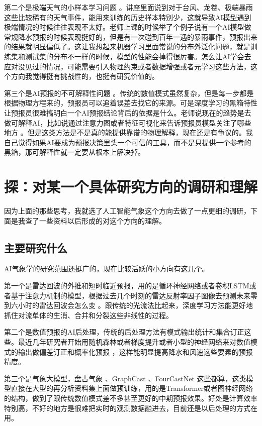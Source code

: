 \documentclass{article}
\begin{document}
第二个是极端天气的小样本学习问题 \cite{Gagne2014Machine}。讲座里面说到对于台风、龙卷、极端暴雨这些比较稀有的天气事件，能用来训练的历史样本特别少，这就导致AI模型遇到极端情况的时候往往表现不太好。老师上课的时候举了个例子说有一个AI模型做常规降水预报的时候表现挺好的，但是有一次碰到百年一遇的暴雨事件，预报出来的结果就明显偏低了。这让我想起来机器学习里面常说的分布外泛化问题，就是训练集和测试集的分布不一样的时候，模型的性能会掉得很厉害。怎么让AI学会去应对没见过的情况，可能需要引入物理约束或者数据增强或者元学习这些方法，这个方向我觉得挺有挑战性的，也挺有研究价值的。

第三个是AI预报的不可解释性问题 \cite{Ham2020Deep}。传统的数值模式虽然复杂，但是每一步都是根据物理方程来的，预报员可以追着误差去找它的来源。可是深度学习的黑箱特性让预报员很难搞明白一个AI预报结论背后的依据是什么。老师说现在的趋势是去做可解释AI，比如说通过注意力图或者特征可视化来告诉预报员模型关注了哪些地方 \cite{Tjoa2020Survey}。但是这类方法是不是真的能提供靠谱的物理解释，现在还是有争议的。我自己觉得如果AI要成为预报决策里头一个可信的工具，而不是只提供一个参考的黑箱，那可解释性就一定要从根本上解决掉。

\section{探：对某一个具体研究方向的调研和理解}

因为上面的那些思考，我就选了人工智能气象这个方向去做了一点更细的调研，下面是我查了一些资料以后形成的对这个方向的理解。

\subsection{主要研究什么}

AI气象学的研究范围还挺广的，现在比较活跃的小方向有这几个。

第一个是雷达回波的外推和短时临近预报，用的是循环神经网络或者卷积LSTM或者基于注意力机制的模型，根据过去几个时刻的雷达反射率因子图像去预测未来零到六小时的雷达回波会怎么变 \cite{Shi2015Convolutional}。跟传统的光流法比起来，深度学习方法能更好地抓住对流单体的生消、合并和分裂这些非线性的过程。

第二个是数值预报的AI后处理，传统的后处理方法有模式输出统计和集合订正这些。最近几年研究者开始用随机森林或者梯度提升或者小型的神经网络来对数值模式的输出做偏差订正和概率化预报 \cite{Rasp2018Deep}，这样能明显提高降水和风速这些要素的预报精度。

第三个是气象大模型，盘古气象 \cite{Bi2022}、GraphCast \cite{Lam2023}、FourCastNet \cite{Pathak2022FourCastNet} 这些都算，这类模型直接在大型的再分析资料集上面做预训练，用的是Transformer或者图神经网络的结构，做到了跟传统数值模式差不多甚至更好的中期预报效果。好处是计算效率特别高，不好的地方是很难把实时的观测数据融进去，目前还是以后处理的方式在用。
\end{document}
